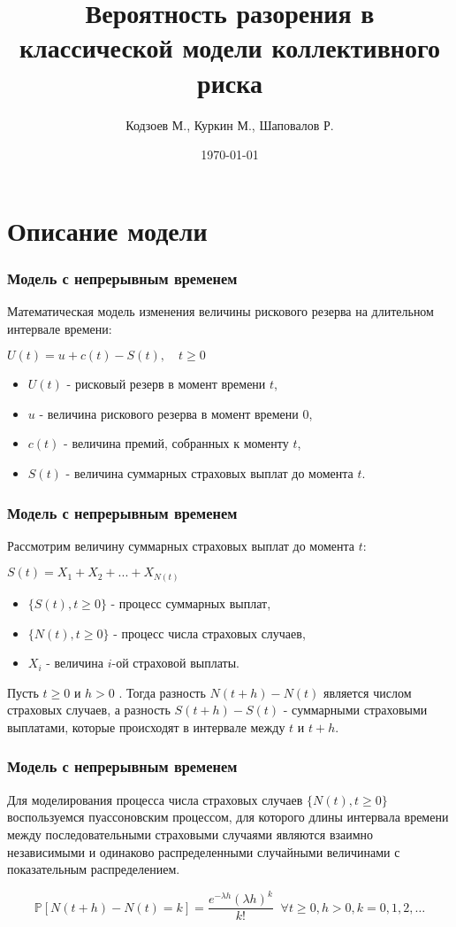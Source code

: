 \documentclass[10pt]{beamer}
\title[Модель коллективного риска]{Вероятность разорения в классической модели коллективного риска}
\author{Кодзоев М., Куркин М., Шаповалов Р.}
\institute[ВМК МГУ]
{
Московский Государственный Университет им. Ломоносова
}
\date{\today}
\numberwithin{equation}{section}
\begin{document}
\begin{frame}       
\titlepage
\end{frame}


\begin{frame}
\tableofcontents
\end{frame}


\section{Описание модели}
\begin{frame}
\frametitle{Модель с непрерывным временем}
\begin{flushleft}
Математическая модель изменения величины рискового резерва на длительном интервале времени:
\end{flushleft}

$U(t) = u + c(t) - S(t),\quad t \geq 0$
\begin{itemize}
    \item $U(t)$ - рисковый резерв в момент времени $t$,
    \item $u$ - величина рискового резерва в момент времени 0,
    \item $c(t)$ - величина премий, собранных к моменту $t$,
    \item $S(t)$ - величина суммарных страховых выплат до момента $t$.
\end{itemize}
\end{frame}


\begin{frame}
\frametitle{Модель с непрерывным временем}
\noindent
Рассмотрим величину суммарных страховых выплат до момента $t$:
\par\medskip
$S(t) = X_{1}+X_{2}+...+X_{N(t)}$
\begin{itemize}
    \item $\{S(t), t \geq 0\}$ - процесс суммарных выплат,
    \item $\{N(t), t \geq 0\}$ - процесс числа страховых случаев,
    \item $X_i$ - величина $i$-ой страховой выплаты.
\end{itemize}
\par\medskip \noindent
Пусть $t\geq 0$ и $h> 0$ . Тогда разность $N(t+h)-N(t)$ является числом страховых случаев,
а разность $S(t+h) -S(t)$ - суммарными страховыми выплатами,
которые происходят в интервале между $t$ и $t + h$.
\end{frame}


\begin{frame}
\frametitle{Модель с непрерывным временем}
\noindent
Для моделирования процесса числа страховых случаев $\{N(t), t \geq 0\}$ воспользуемся
пуассоновским процессом, для которого длины интервала времени между последовательными страховыми
случаями являются взаимно независимыми и одинаково распределенными случайными величинами
с показательным распределением.
\par\medskip \noindent
\begin{equation*}
\mathbb{P}[N(t+h)-N(t)=k] = \frac{e^{- \lambda h}(\lambda h)^{k}}{k!}
\;\; \forall t \geq 0, h > 0, k = 0, 1, 2, \dots
\end{equation*}
\end{frame}
\end{document}
